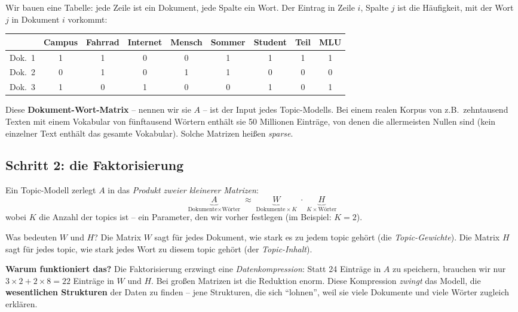 \documentclass[a4paper,11pt]{article}
\begin{document}
Wir bauen eine Tabelle: jede Zeile ist ein Dokument, jede Spalte ein
Wort. Der Eintrag in Zeile $i$, Spalte $j$ ist die Häufigkeit, mit
der Wort $j$ in Dokument $i$ vorkommt:

\smallskip
\begin{center}
\footnotesize
\begin{tabular}{@{}l|cccccccc@{}}
\toprule
& Campus & Fahrrad & Internet & Mensch & Sommer & Student & Teil & MLU \\
\midrule
Dok.\ 1 & 1 & 1 & 0 & 0 & 1 & 1 & 1 & 1 \\
Dok.\ 2 & 0 & 1 & 0 & 1 & 1 & 0 & 0 & 0 \\
Dok.\ 3 & 1 & 0 & 1 & 0 & 0 & 1 & 0 & 1 \\
\bottomrule
\end{tabular}
\end{center}
\smallskip

Diese \textbf{Dokument-Wort-Matrix} -- nennen wir sie $A$ -- ist der
Input jedes Topic-Modells. Bei einem realen Korpus von z.B.\ zehntausend
Texten mit einem Vokabular von fünftausend Wörtern enthält sie 50
Millionen Einträge, von denen die allermeisten Nullen sind (kein
einzelner Text enthält das gesamte Vokabular). Solche Matrizen heißen
\emph{sparse}.

\subsection{Schritt 2: die Faktorisierung}

Ein Topic-Modell zerlegt $A$ in das \emph{Produkt zweier kleinerer
Matrizen}:
\[
\underbrace{A}_{\text{Dokumente}\times\text{Wörter}}
\;\approx\;
\underbrace{W}_{\text{Dokumente}\times K}
\;\cdot\;
\underbrace{H}_{K\times\text{Wörter}}
\]
wobei $K$ die Anzahl der topics ist -- ein Parameter, den wir vorher
festlegen (im Beispiel: $K=2$).

Was bedeuten $W$ und $H$? Die Matrix $W$ sagt für jedes Dokument, wie
stark es zu jedem topic gehört (die \emph{Topic-Gewichte}). Die Matrix
$H$ sagt für jedes topic, wie stark jedes Wort zu diesem topic gehört
(der \emph{Topic-Inhalt}).

\begin{merkbox}
\textbf{Warum funktioniert das?} Die Faktorisierung erzwingt eine
\emph{Datenkompression}: Statt 24 Einträge in $A$ zu speichern,
brauchen wir nur $3\times 2 + 2\times 8 = 22$ Einträge in $W$ und $H$.
Bei großen Matrizen ist die Reduktion enorm. Diese Kompression
\emph{zwingt} das Modell, die \textbf{wesentlichen Strukturen} der
Daten zu finden -- jene Strukturen, die sich \enquote{lohnen}, weil sie
viele Dokumente und viele Wörter zugleich erklären.
\end{merkbox}
\end{document}
